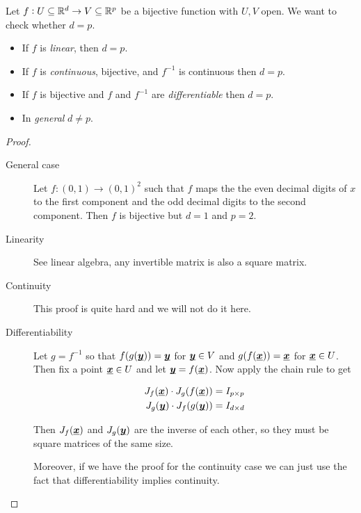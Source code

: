 \documentclass[12pt]{extarticle}
\renewcommand{\vec}[1]{\uvec{#1}}
\begin{document}
\begin{proposition}
    Let $f: U \subseteq \mathbb{R}^d \to V \subseteq \mathbb{R}^p$ be a bijective function with $U, V$ open. We want to check whether $d = p$.

    \begin{itemize}
        \item If $f$ is \emph{linear}, then $d = p$.
        \item If $f$ is \emph{continuous}, bijective, and $f^{-1}$ is continuous then $d = p$.
        \item If $f$ is bijective and $f$ and $f^{-1}$ are \emph{differentiable} then $d = p$.
        \item In \emph{general} $d \neq p$.
    \end{itemize}
\end{proposition}

\begin{proof}
    \skiplineafterproof
    \begin{description}
        \item[General case]
              Let $f : (0,1) \to (0,1)^2$ such that $f$ maps the the even decimal digits of $x$ to the first component and the odd decimal digits to the second component.
              Then $f$ is bijective but $d = 1$ and $p = 2$.

        \item[Linearity]
              See linear algebra, any invertible matrix is also a square matrix.

        \item[Continuity]
              This proof is quite hard and we will not do it here.

        \item[Differentiability]
              Let $g = f^{-1}$ so that $f(g(\vec{y})) = \vec{y}$ for $\vec{y} \in V$ and $g(f(\vec{x})) = \vec{x}$ for $\vec{x} \in U$.
              Then fix a point $\vec{x} \in U$ and let $\vec{y} = f(\vec{x})$.
              Now apply the chain rule to get

              \begin{align}
                  J_f(\vec{x}) \cdot J_g(f(\vec{x})) & = I_{p\times p} \\
                  J_g(\vec{y}) \cdot J_f(g(\vec{y})) & = I_{d\times d}
              \end{align}

              Then $J_f(\vec{x})$ and $J_g(\vec{y})$ are the inverse of each other, so they must be square matrices of the same size.

              Moreover, if we have the proof for the continuity case we can just use the fact that differentiability implies continuity.
    \end{description}
\end{proof}
\end{document}
